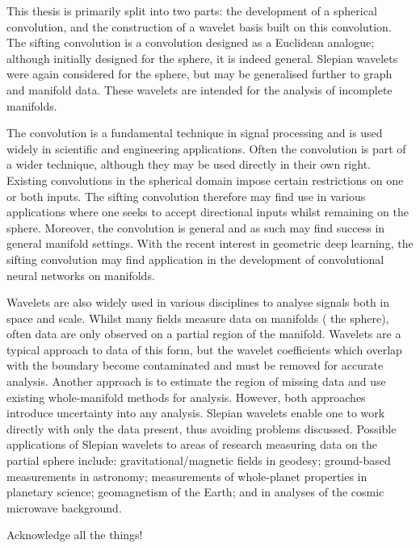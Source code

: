\begin{impactstatement}
    This thesis is primarily split into two parts: the development of a spherical convolution, and the construction of a wavelet basis built on this convolution.
    The sifting convolution is a convolution designed as a Euclidean analogue; although initially designed for the sphere, it is indeed general.
    Slepian wavelets were again considered for the sphere, but may be generalised further to graph and manifold data.
    These wavelets are intended for the analysis of incomplete manifolds.

    The convolution is a fundamental technique in signal processing and is used widely in scientific and engineering applications.
    Often the convolution is part of a wider technique, although they may be used directly in their own right.
    Existing convolutions in the spherical domain impose certain restrictions on one or both inputs.
    The sifting convolution therefore may find use in various applications where one seeks to accept directional inputs whilst remaining on the sphere.
    Moreover, the convolution is general and as such may find success in general manifold settings.
    With the recent interest in geometric deep learning, the sifting convolution may find application in the development of convolutional neural networks on manifolds.

    Wavelets are also widely used in various disciplines to analyse signals both in space and scale.
    Whilst many fields measure data on manifolds (\ie{} the sphere), often data are only observed on a partial region of the manifold.
    Wavelets are a typical approach to data of this form, but the wavelet coefficients which overlap with the boundary become contaminated and must be removed for accurate analysis.
    Another approach is to estimate the region of missing data and use existing whole-manifold methods for analysis.
    However, both approaches introduce uncertainty into any analysis.
    Slepian wavelets enable one to work directly with only the data present, thus avoiding problems discussed.
    Possible applications of Slepian wavelets to areas of research measuring data on the partial sphere include: gravitational/magnetic fields in geodesy; ground-based measurements in astronomy; measurements of whole-planet properties in planetary science; geomagnetism of the Earth; and in analyses of the cosmic microwave background.
\end{impactstatement}

\begin{acknowledgements}
	Acknowledge all the things!
\end{acknowledgements}

\setcounter{tocdepth}{2}

\tableofcontents
\listoffigures
\listoftables
